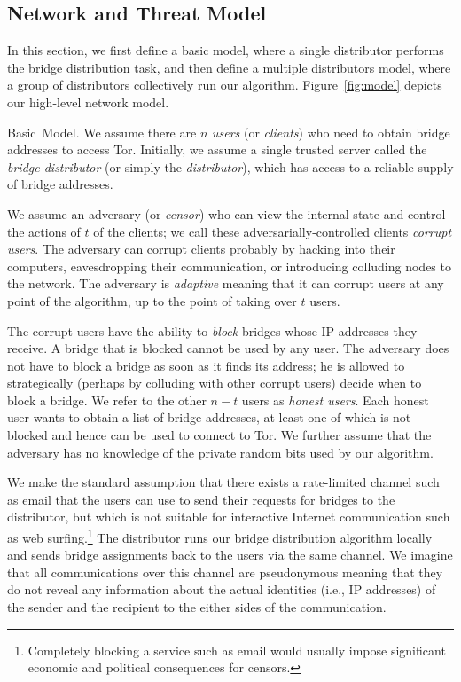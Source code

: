 \documentclass{sig-alternate-05-2015}
\newcommand{\fullpaper}[1]{#1}
\newcommand{\fullpaper}[1]{}
\newcommand{\sfsize}{\fontsize{0.8\baselineskip}{0.68\baselineskip}\selectfont}
\newcommand{\sans}[1]{\textsf{\sfsize \mbox{#1}}}
\newcommand{\para}[1]{\vspace{0.55em} \noindent \sans{{\mbox{#1}}}}
\begin{document}
\subsection{Network and Threat Model} \label{sec:model}

In this section, we first define a basic model, where a single distributor performs the bridge distribution task, and then define a multiple distributors model, where a group of distributors collectively run our algorithm. Figure~\ref{fig:model} depicts our high-level network model.

\para{Basic Model.}
We assume there are $n$ \emph{users} (or \emph{clients}) who need to obtain bridge addresses to access Tor. Initially, we assume a single trusted server called the \emph{bridge distributor} (or simply the \emph{distributor}), which has access to a reliable supply of bridge addresses.%

We assume an adversary (or \emph{censor}) who can view the internal state and control the actions of $t$ of the clients; we call these adversarially-controlled clients \emph{corrupt users}. \fullpaper{The adversary can corrupt clients probably by hacking into their computers, eavesdropping their communication, or introducing colluding nodes to the network.}
The adversary is \emph{adaptive} meaning that it can corrupt users at any point of the algorithm, up to the point of taking over $t$ users.

The corrupt users have the ability to \emph{block} bridges whose IP addresses they receive. A bridge that is blocked cannot be used by any user.
The adversary does not have to block a bridge as soon as it finds its address; he is allowed to strategically (perhaps by colluding with other corrupt users) decide when to block a bridge. 
We refer to the other ${n-t}$ users as \emph{honest users}. Each honest user wants to obtain a list of bridge addresses, at least one of which is not blocked and hence can be used to connect to Tor. 
We further assume that the adversary has no knowledge of the private random bits used by our algorithm.

We make the standard assumption that there exists a rate-limited channel such as email that the users can use to send their requests for bridges to the distributor, but which is not suitable for interactive Internet communication such as web surfing.\footnote{Completely blocking a service such as email would usually impose significant economic and political consequences for censors.} The distributor runs our bridge distribution algorithm locally and sends bridge assignments back to the users via the same channel. \fullpaper{We imagine that all communications over this channel are pseudonymous meaning that they do not reveal any information about the actual identities (i.e., IP addresses) of the sender and the recipient to the either sides of the communication.}
\end{document}
